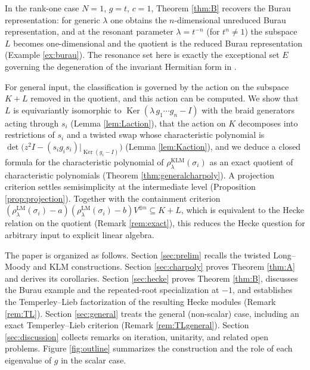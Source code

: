 \documentclass[11pt]{article}
\theoremstyle{definition}
\theoremstyle{remark}
\newcommand{\Ker}{\operatorname{Ker}}
\newcommand{\rLMl}{\rho^{\mathrm{LM}}_{\lambda}}
\newcommand{\rKLM}{\rho^{\mathrm{KLM}}_{\lambda}}
\begin{document}
In the rank-one case $N = 1$, $g = t$, $c = 1$, Theorem \ref{thm:B}
recovers the Burau representation: for generic $\lambda$ one obtains the
$n$-dimensional unreduced Burau representation, and at the resonant
parameter $\lambda = t^{-n}$ (for $t^{n} \neq 1$) the subspace $L$
becomes one-dimensional and
the quotient is the reduced Burau representation
(Example \ref{ex:burau}). The resonance set here is exactly the exceptional
set $E$ governing the degeneration of the invariant Hermitian form in
\cite{Negami25}.

For general input, the classification is governed by the action on the
subspace $K + L$ removed in the quotient, and this action can be
computed. We show that $L$ is equivariantly isomorphic to
$\Ker(\lambda\, g_1 \cdots g_n - I)$ with the braid generators acting
through $s_i$ (Lemma \ref{lem:Laction}), that the action on $K$
decomposes into restrictions of $s_i$ and a twisted swap whose
characteristic polynomial is
$\det\bigl(z^2 I - (s_i g_i s_i)|_{\Ker(g_i - I)}\bigr)$ (Lemma
\ref{lem:Kaction}), and we
deduce a closed formula for the characteristic polynomial of
$\rKLM(\sigma_i)$ as an exact quotient of characteristic polynomials
(Theorem \ref{thm:generalcharpoly}). A projection criterion settles
semisimplicity at the intermediate level (Proposition
\ref{prop:projection}). Together with the containment criterion
$(\rLMl(\sigma_i) - a)(\rLMl(\sigma_i) - b)V^{\oplus n} \subseteq K + L$,
which is equivalent to the Hecke relation on the quotient (Remark
\ref{rem:exact}), this reduces the Hecke question for arbitrary input
to explicit linear algebra.

The paper is organized as follows. Section \ref{sec:prelim} recalls the
twisted Long--Moody and KLM constructions. Section \ref{sec:charpoly}
proves Theorem \ref{thm:A} and derives its corollaries. Section
\ref{sec:hecke} proves Theorem \ref{thm:B}, discusses the Burau example
and the repeated-root specialization at $-1$, and establishes the
Temperley--Lieb factorization of the resulting Hecke modules (Remark
\ref{rem:TL}). Section \ref{sec:general}
treats the general (non-scalar) case, including an exact
Temperley--Lieb criterion (Remark \ref{rem:TLgeneral}). Section \ref{sec:discussion}
collects remarks on iteration, unitarity, and related open problems.
Figure \ref{fig:outline} summarizes the construction and the role of
each eigenvalue of $g$ in the scalar case.
\end{document}
